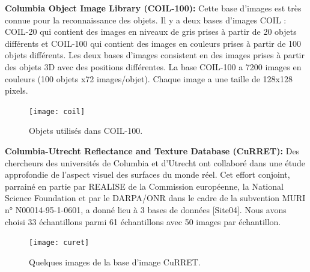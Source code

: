\textbf{Columbia Object Image Library (COIL-100):}
Cette base d’images est très connue pour la reconnaissance des objets. Il y a deux bases d’images COIL : COIL-20 qui contient des images en niveaux de gris prises à partir de 20 objets différents et COIL-100 qui contient des images en couleurs prises à partir de 100 objets différents. Les deux bases d’images consistent en des images prises à partir des objets 3D avec des positions différentes. La base COIL-100 a 7200 images en couleurs (100 objets x72 images/objet). Chaque image a une taille de 128x128 pixels.

\begin{figure}[H]
	\centering
	\texttt{[image: coil]} 
	\caption{Objets utilisés dans COIL-100.}
\end{figure}

\textbf{Columbia-Utrecht Reflectance and Texture Database (CuRRET):}
Des chercheurs des universités de Columbia et d'Utrecht ont collaboré dans une étude approfondie de l'aspect visuel des surfaces du monde réel. Cet effort conjoint, parrainé en partie par REALISE de la Commission européenne, la National Science Foundation et par le DARPA/ONR dans le cadre de la subvention MURI n° N00014-95-1-0601, a donné lieu à 3 bases de données [Site04]. Nous avons choisi 33 échantillons parmi 61 échantillons avec 50 images par échantillon.
\begin{figure}[H]
	\centering
	\texttt{[image: curet]} 
	\caption{Quelques images de la base d’image CuRRET.}
\end{figure}

